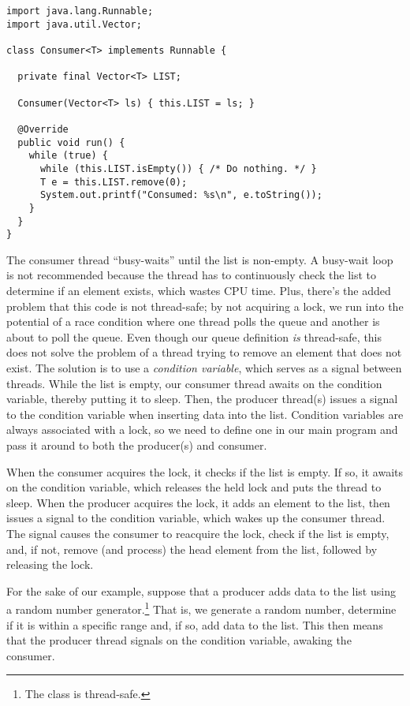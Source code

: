 \begin{lstlisting}[language=MyJava]
import java.lang.Runnable;
import java.util.Vector;

class Consumer<T> implements Runnable {

  private final Vector<T> LIST;

  Consumer(Vector<T> ls) { this.LIST = ls; }

  @Override
  public void run() {
    while (true) {
      while (this.LIST.isEmpty()) { /* Do nothing. */ }
      T e = this.LIST.remove(0);
      System.out.printf("Consumed: %s\n", e.toString());
    }
  }
}
\end{lstlisting}

The consumer thread ``busy-waits'' until the list is non-empty. 
A busy-wait loop is not recommended because the thread has to continuously check the list to determine if an element exists, which wastes CPU time. 
Plus, there's the added problem that this code is not thread-safe; by not acquiring a lock, we run into the potential of a race condition where one thread polls the queue and another is about to poll the queue. 
Even though our queue definition \emph{is} thread-safe, this does not solve the problem of a thread trying to remove an element that does not exist. 
The solution is to use a \emph{condition variable}, which serves as a signal between threads. 
While the list is empty, our consumer thread awaits on the condition variable, thereby putting it to sleep. 
Then, the producer thread(s) issues a signal to the condition variable when inserting data into the list. 
Condition variables are always associated with a lock, so we need to define one in our main program and pass it around to both the producer(s) and consumer. 

When the consumer acquires the lock, it checks if the list is empty. 
If so, it awaits on the condition variable, which releases the held lock and puts the thread to sleep. 
When the producer acquires the lock, it adds an element to the list, then issues a signal to the condition variable, which wakes up the consumer thread. 
The signal causes the consumer to reacquire the lock, check if the list is empty, and, if not, remove (and process) the head element from the list, followed by releasing the lock.

For the sake of our example, suppose that a producer adds data to the list using a random number generator.\footnote{The  class is thread-safe.} 
That is, we generate a random number, determine if it is within a specific range and, if so, add data to the list. 
This then means that the producer thread signals on the condition variable, awaking the consumer.

